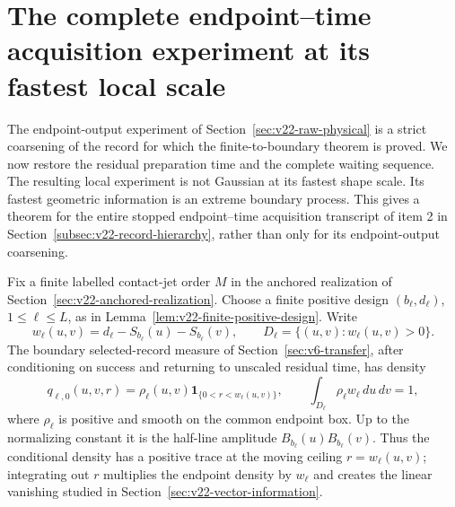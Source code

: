 \section{The complete endpoint--time acquisition experiment at its fastest local scale}
\label{sec:v23-full-endpoint-time}

The endpoint-output experiment of Section~\ref{sec:v22-raw-physical} is a
strict coarsening of the record for which the finite-to-boundary theorem is
proved.  We now restore the residual preparation time and the complete waiting
sequence.  The resulting local experiment is not Gaussian at its fastest shape
scale.  Its fastest geometric information is an extreme boundary process.
This gives a theorem for the entire stopped endpoint--time acquisition
transcript of item 2 in Section~\ref{subsec:v22-record-hierarchy}, rather than
only for its endpoint-output coarsening.

Fix a finite labelled contact-jet order \(M\) in the anchored realization of
Section~\ref{sec:v22-anchored-realization}.  Choose a finite positive design
\((b_\ell,d_\ell)\), \(1\le\ell\le L\), as in
Lemma~\ref{lem:v22-finite-positive-design}.  Write
\[
 w_\ell(u,v)=d_\ell-S_{b_\ell}(u)-S_{b_\ell}(v),
 \qquad
 D_\ell=\{(u,v):w_\ell(u,v)>0\}.
\]
The boundary selected-record measure of Section~\ref{sec:v6-transfer}, after
conditioning on success and returning to unscaled residual time, has density
\begin{equation}\label{eq:v23-et-base-density}
 q_{\ell,0}(u,v,r)
 =\rho_\ell(u,v)
   \mathbf 1_{\{0<r<w_\ell(u,v)\}},
 \qquad
 \int_{D_\ell}\rho_\ell w_\ell\,du\,dv=1,
\end{equation}
where \(\rho_\ell\) is positive and smooth on the common endpoint box.  Up to
the normalizing constant it is the half-line amplitude
\(B_{b_\ell}(u)B_{b_\ell}(v)\).  Thus the conditional density has a positive
trace at the moving ceiling \(r=w_\ell(u,v)\); integrating out \(r\)
multiplies the endpoint density by \(w_\ell\) and creates the linear vanishing
studied in Section~\ref{sec:v22-vector-information}.

